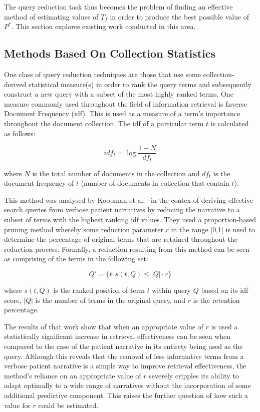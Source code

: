 \documentclass[a4paper]{report}
\begin{document}
The query reduction task thus becomes the problem of finding an effective method of estimating values of $T_f$ in order to produce the best possible value of $P^*$. This section explores existing work conducted in this area.

\subsection{Methods Based On Collection Statistics}

One class of query reduction techniques are those that use some collection-derived statistical measure(s) in order to rank the query terms and subsequently construct a new query with a subset of the most highly ranked terms. One measure commonly used throughout the field of information retrieval is Inverse Document Frequency (idf). This is used as a measure of a term's importance throughout the document collection. The idf of a particular term $t$ is calculated as follows:

$$idf_t = \log{\frac{1+N}{df_t}}$$

where $N$ is the total number of documents in the collection and $df_t$ is the document frequency of $t$ (number of documents in collection that contain $t$).

This method was analysed by Koopman et al.~\citep{koopman2017generating} in the contex of deriving effective search queries from verbose patient narratives by reducing the narrative to a subset of terms with the highest ranking idf values. They used a proportion-based pruning method whereby some reduction parameter $r$ in the range [0,1] is used to determine the percentage of original terms that are retained throughout the reduction process. Formally, a reduction resulting from this method can be seen as comprising of the terms in the following set:

$$Q' = \{ t : s(t,Q) \leq |Q| \cdot r \}$$

where $s(t,Q)$ is the ranked position of term $t$ within query $Q$ based on its idf score, $|Q|$ is the number of terms in the original query, and $r$ is the retention percentage.

The results of that work show that when an appropriate value of $r$ is used a statistically significant increase in retrieval effectiveness can be seen when compared to the case of the patient narrative in its entirety being used as the query. Although this reveals that the removal of less informative terms from a verbose patient narrative is a simple way to improve retrieval effectiveness, the method's reliance on an appropriate value of $r$ severely cripples its ability to adapt optimally to a wide range of narratives without the incorporation of some additional predictive component. This raises the further question of how such a value for $r$ could be estimated.
\end{document}
